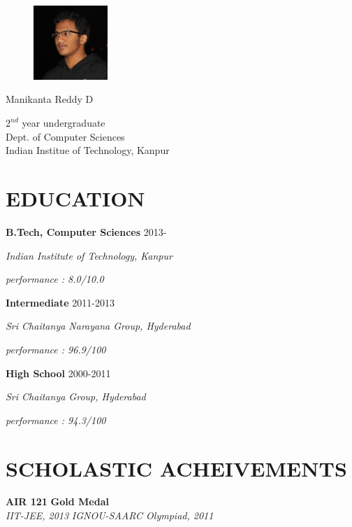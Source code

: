 \documentclass{article}
\newcommand{\sepspace}{\vspace*{1em}}
\newcommand{\MyName}[1]{
		\huge \usefont{OT1}{phv}{b}{n} \hfill #1 		
		\par \normalsize \normalfont
		}
\newcommand{\NewPart}[1]{\section*{\uppercase{#1}}}
\newcommand{\EducationEntry}[4]{
		\noindent \textbf{#1} \hfill 	{#2} \par				
		\noindent \textit{#3} \par	
		\noindent #4 	
		\normalsize \par
		}
\newcommand{\ScholasticAcheivements}[4]{
		\noindent \textbf{#1} \hfill \textbf{#2} \\
		\textit{#3}	 \hfill	 \textit{ #4} 	
		\normalsize \par
		}
\begin{document}
\begin{figure}
	\vspace*{-2em}
		\includegraphics[width=0.25\textwidth]{photo.jpg}
\end{figure}

\MyName{Manikanta Reddy D}
\begin{flushright}
	$2^{nd}$ year undergraduate\\
	Dept. of Computer Sciences\\
	Indian Institue of Technology, Kanpur
\end{flushright}

\sepspace

\NewPart{Education}{}

\EducationEntry{B.Tech, Computer Sciences}{2013-}{Indian Institute of Technology, Kanpur}{\emph{performance : 8.0/10.0}}

\sepspace

\EducationEntry{Intermediate}{2011-2013}{Sri Chaitanya Narayana Group, Hyderabad}{\b{\emph{performance : 96.9/100}}}

\sepspace

\EducationEntry{High School}{2000-2011}{Sri Chaitanya Group, Hyderabad}{\b{\emph{performance : 94.3/100}}}

\sepspace

\NewPart{Scholastic Acheivements}{}

\ScholasticAcheivements{AIR 121}{Gold Medal}{IIT-JEE, 2013}{IGNOU-SAARC Olympiad, 2011}
\end{document}
